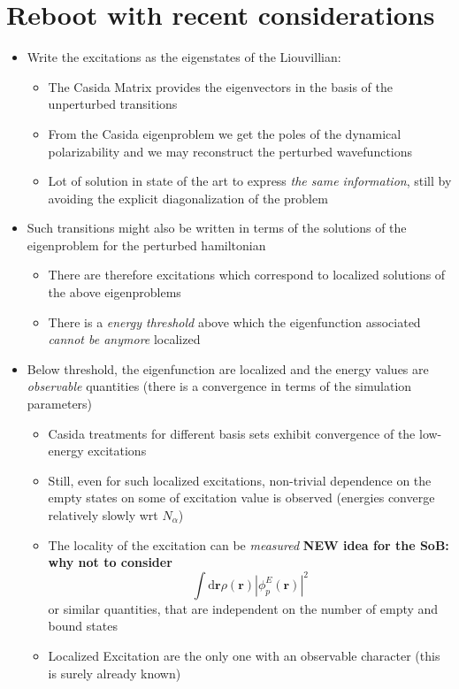 \documentclass[a4paper]{article}
\begin{document}
\section{Reboot with recent considerations}
\begin{itemize}
\item Write the excitations as the eigenstates of the Liouvillian:
\begin{itemize}
\item The Casida Matrix provides the eigenvectors in the basis of the unperturbed transitions
\item From the Casida eigenproblem we 
get the poles of the dynamical polarizability and we may reconstruct the perturbed wavefunctions
\item Lot of solution in state of 
the art to express \emph{the same information}, still by avoiding the explicit diagonalization of the problem
\end{itemize}
\item Such transitions might also be written in terms of the solutions of the eigenproblem for the perturbed hamiltonian
\begin{itemize}
\item There are therefore excitations which correspond to localized solutions of the above eigenproblems
\item There is a \emph{energy threshold} above which the eigenfunction associated \emph{cannot be anymore} localized
\end{itemize}
\item Below threshold, the eigenfunction are localized and the energy values are \emph{observable} quantities (there is a convergence in terms of the simulation parameters)
\begin{itemize}
\item Casida treatments for different
basis sets exhibit convergence of the low-energy excitations
\item Still, even for such localized excitations, non-trivial dependence on the empty states on some of excitation value is observed (energies converge relatively slowly wrt $N_\alpha$)
\item The locality of the excitation can be \emph{measured}
{\bf NEW idea for the SoB: why not to consider}
$$
\int \mathrm d \mathbf r
\rho(\mathbf r) |\phi_p^E(\mathbf r)|^2
$$
or similar quantities, that are independent on the number of empty and  bound states
\item Localized Excitation are the  only one with an observable character (this is surely already known)

\end{itemize}
\end{itemize}
\end{document}
